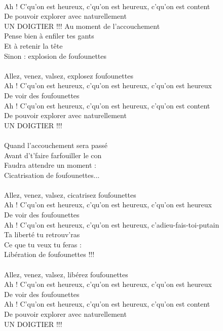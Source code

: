 \\Ah ! C'qu'on est heureux, c'qu'on est heureux, c'qu'on est content
\\De pouvoir explorer avec naturellement
\\UN DOIGTIER !!!
\breakpage
Au moment de l'accouchement ~~\bissimple
\\Pense bien à enfiler tes gants
\\Et à retenir la tête ~~~~~~~~~~~~~~~~~ \bissimple
\\Sinon : explosion de foufounettes
\\\\Allez, venez, valsez, explosez foufounettes
\\Ah ! C'qu'on est heureux, c'qu'on est heureux, c'qu'on est heureux
\\De voir des foufounettes
\\Ah ! C'qu'on est heureux, c'qu'on est heureux, c'qu'on est content
\\De pouvoir explorer avec naturellement
\\UN DOIGTIER !!!
\\\\Quand l'accouchement sera passé ~~\bissimple
\\Avant d't'faire farfouiller le con
\\Faudra attendre un moment : ~~~~~~~\bissimple
\\Cicatrisation de foufounettes...
\\\\Allez, venez, valsez, cicatrisez foufounettes
\\Ah ! C'qu'on est heureux, c'qu'on est heureux, c'qu'on est heureux
\\De voir des foufounettes
\\Ah ! C'qu'on est heureux, c'qu'on est heureux, c'adieu-fais-toi-putain
\\Ta liberté tu retrouv'ras
\\Ce que tu veux tu feras : ~~~~~~~~~~\bissimple
\\Libération de foufounettes !!!
\\\\Allez, venez, valsez, libérez foufounettes
\\Ah ! C'qu'on est heureux, c'qu'on est heureux, c'qu'on est heureux
\\De voir des foufounettes
\\Ah ! C'qu'on est heureux, c'qu'on est heureux, c'qu'on est content
\\De pouvoir explorer avec naturellement
\\UN DOIGTIER !!!

\breakpage